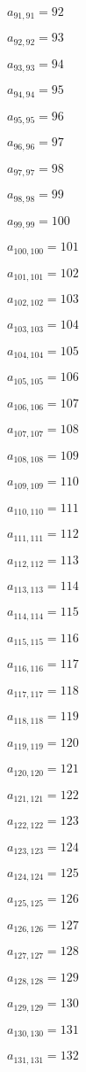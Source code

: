 \documentclass[a4paper,12pt]{article}
\begin{document}
$a _{ 91, 91 } = 92$

$a _{ 92, 92 } = 93$

$a _{ 93, 93 } = 94$

$a _{ 94, 94 } = 95$

$a _{ 95, 95 } = 96$

$a _{ 96, 96 } = 97$

$a _{ 97, 97 } = 98$

$a _{ 98, 98 } = 99$

$a _{ 99, 99 } = 100$

$a _{ 100, 100 } = 101$

$a _{ 101, 101 } = 102$

$a _{ 102, 102 } = 103$

$a _{ 103, 103 } = 104$

$a _{ 104, 104 } = 105$

$a _{ 105, 105 } = 106$

$a _{ 106, 106 } = 107$

$a _{ 107, 107 } = 108$

$a _{ 108, 108 } = 109$

$a _{ 109, 109 } = 110$

$a _{ 110, 110 } = 111$

$a _{ 111, 111 } = 112$

$a _{ 112, 112 } = 113$

$a _{ 113, 113 } = 114$

$a _{ 114, 114 } = 115$

$a _{ 115, 115 } = 116$

$a _{ 116, 116 } = 117$

$a _{ 117, 117 } = 118$

$a _{ 118, 118 } = 119$

$a _{ 119, 119 } = 120$

$a _{ 120, 120 } = 121$

$a _{ 121, 121 } = 122$

$a _{ 122, 122 } = 123$

$a _{ 123, 123 } = 124$

$a _{ 124, 124 } = 125$

$a _{ 125, 125 } = 126$

$a _{ 126, 126 } = 127$

$a _{ 127, 127 } = 128$

$a _{ 128, 128 } = 129$

$a _{ 129, 129 } = 130$

$a _{ 130, 130 } = 131$

$a _{ 131, 131 } = 132$
\end{document}
